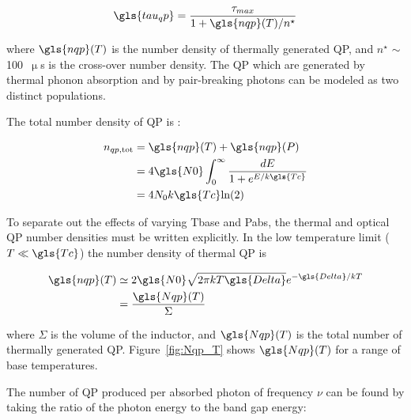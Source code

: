 \begin{equation}\label{eq:tau_qp}
  \gls{tau_qp} = \frac{\tau_{max}}{1 + \gls{nqp}(T)/n^{\star}}
\end{equation}

where $\gls{nqp}(T)$ is the number density of thermally generated QP, and $n^{\star}$ $\sim$ 100~$\upmu$s is the cross-over number density. The QP which are generated by thermal phonon absorption and by pair-breaking photons can be modeled as two distinct populations.

The total number density of QP is \citep{mauskopf2018transition}:

\begin{equation}\label{eq:nqp_tot}
  \begin{aligned}
  n_{qp,\mathrm{tot}} &= \gls{nqp}(T) + \gls{nqp}(P) \\
          &= 4\gls{N0} \int_{0}^{\infty} \frac{dE}{1 + e^{E/k\gls{Tc}}} \\
          &= 4N_{0}k\gls{Tc}\text{ln(2)}
  \end{aligned}
\end{equation}

To separate out the effects of varying \gls{Tbase} and \gls{Pabs}, the thermal and optical QP number densities must be written explicitly. In the low temperature limit ($T \ll \gls{Tc}$) the number density of thermal QP is

\begin{equation}\label{eq:Nqp_T}
  \begin{aligned}
  \gls{nqp}(T) &\simeq 2\gls{N0}\sqrt{2\pi k T \gls{Delta}}e^{-\gls{Delta}/kT} \\
               &= \frac{\gls{Nqp}(T)}{\Sigma}
  \end{aligned}
\end{equation}

where $\Sigma$ is the volume of the inductor, and $\gls{Nqp}(T)$ is the total number of thermally generated QP\@.  Figure~\ref{fig:Nqp_T} shows $\gls{Nqp}(T)$ for a range of base temperatures.

The number of QP produced per absorbed photon of frequency $\nu$ can be found by taking the ratio of the photon energy to the band gap energy:

